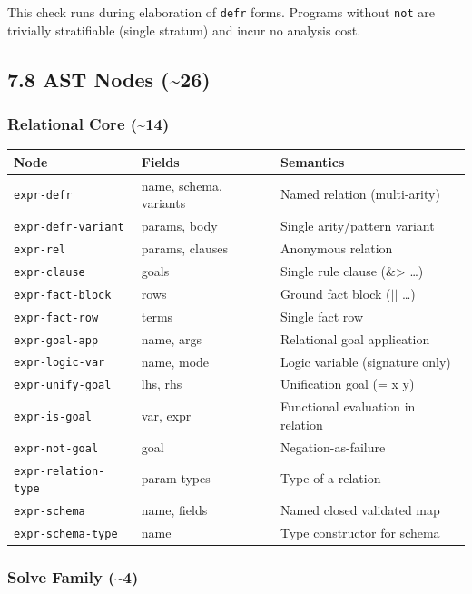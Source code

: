 \documentclass[11pt]{article}
\begin{document}
This check runs during elaboration of \texttt{defr} forms. Programs without \texttt{not} are
trivially stratifiable (single stratum) and incur no analysis cost.
\subsection{7.8 AST Nodes (\textasciitilde{}26)}
\label{sec:orgcca4f2d}

\subsubsection{Relational Core (\textasciitilde{}14)}
\label{sec:org3e02671}

\begin{center}
\begin{tabular}{lll}
Node & Fields & Semantics\\
\hline
\texttt{expr-defr} & name, schema, variants & Named relation (multi-arity)\\
\texttt{expr-defr-variant} & params, body & Single arity/pattern variant\\
\texttt{expr-rel} & params, clauses & Anonymous relation\\
\texttt{expr-clause} & goals & Single rule clause (\&> \ldots{})\\
\texttt{expr-fact-block} & rows & Ground fact block (\(\vert{} \vert{}\) \ldots{})\\
\texttt{expr-fact-row} & terms & Single fact row\\
\texttt{expr-goal-app} & name, args & Relational goal application\\
\texttt{expr-logic-var} & name, mode & Logic variable (signature only)\\
\texttt{expr-unify-goal} & lhs, rhs & Unification goal (= x y)\\
\texttt{expr-is-goal} & var, expr & Functional evaluation in relation\\
\texttt{expr-not-goal} & goal & Negation-as-failure\\
\texttt{expr-relation-type} & param-types & Type of a relation\\
\texttt{expr-schema} & name, fields & Named closed validated map\\
\texttt{expr-schema-type} & name & Type constructor for schema\\
\end{tabular}
\end{center}
\subsubsection{Solve Family (\textasciitilde{}4)}
\label{sec:org165ffae}
\end{document}
